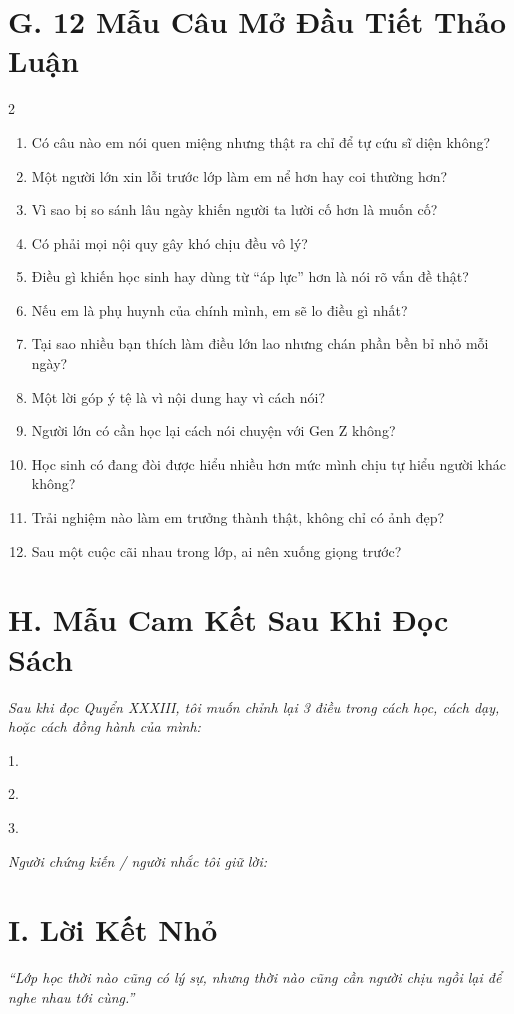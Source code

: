 \section*{G. 12 Mẫu Câu Mở Đầu Tiết Thảo Luận}

\begin{multicols}{2}
\begin{enumerate}[leftmargin=1.2cm]
  \item Có câu nào em nói quen miệng nhưng thật ra chỉ để tự cứu sĩ diện không?
  \item Một người lớn xin lỗi trước lớp làm em nể hơn hay coi thường hơn?
  \item Vì sao bị so sánh lâu ngày khiến người ta lười cố hơn là muốn cố?
  \item Có phải mọi nội quy gây khó chịu đều vô lý?
  \item Điều gì khiến học sinh hay dùng từ ``áp lực'' hơn là nói rõ vấn đề thật?
  \item Nếu em là phụ huynh của chính mình, em sẽ lo điều gì nhất?
  \item Tại sao nhiều bạn thích làm điều lớn lao nhưng chán phần bền bỉ nhỏ mỗi ngày?
  \item Một lời góp ý tệ là vì nội dung hay vì cách nói?
  \item Người lớn có cần học lại cách nói chuyện với Gen Z không?
  \item Học sinh có đang đòi được hiểu nhiều hơn mức mình chịu tự hiểu người khác không?
  \item Trải nghiệm nào làm em trưởng thành thật, không chỉ có ảnh đẹp?
  \item Sau một cuộc cãi nhau trong lớp, ai nên xuống giọng trước?
\end{enumerate}
\end{multicols}

\section*{H. Mẫu Cam Kết Sau Khi Đọc Sách}

\begin{tcolorbox}[
  colback=booksecondary!6,
  colframe=booksecondary!70!black,
  arc=4pt,
  boxrule=0.8pt,
  title={Cam Kết Cá Nhân \quad\textit{(Personal Commitment)}}
]
\textit{Sau khi đọc Quyển XXXIII, tôi muốn chỉnh lại 3 điều trong cách học, cách dạy, hoặc cách đồng hành của mình:}

\vspace{0.3cm}
1. \hrulefill

\vspace{0.55cm}
2. \hrulefill

\vspace{0.55cm}
3. \hrulefill

\vspace{0.45cm}
\textit{Người chứng kiến / người nhắc tôi giữ lời: \hrulefill}
\end{tcolorbox}

\section*{I. Lời Kết Nhỏ}

\begin{center}
{\itshape\color{bookprimary}``Lớp học thời nào cũng có lý sự, nhưng thời nào cũng cần người chịu ngồi lại để nghe nhau tới cùng.''}
\end{center}

\ngancach